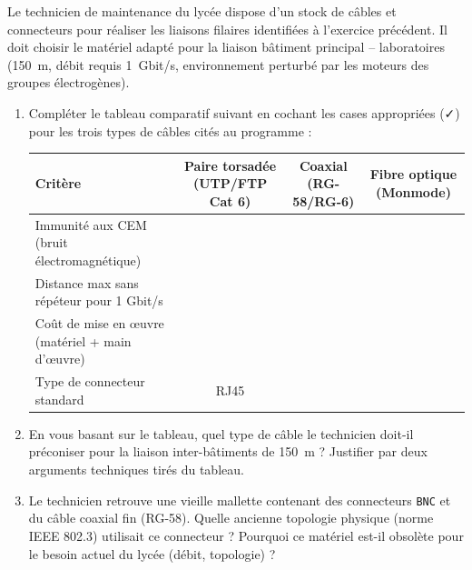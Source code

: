 \documentclass[11pt]{article}
\begin{document}
\begin{exercice}
Le technicien de maintenance du lycée dispose d'un stock de câbles et connecteurs pour réaliser les liaisons filaires identifiées à l'exercice précédent. Il doit choisir le matériel adapté pour la liaison bâtiment principal -- laboratoires (\SI{150}{m}, débit requis \SI{1}{Gbit/s}, environnement perturbé par les moteurs des groupes électrogènes).

\begin{enumerate}
    \item Compléter le tableau comparatif suivant en cochant les cases appropriées (✓) pour les trois types de câbles cités au programme :
    \begin{center}
    \begin{tabular}{|l|c|c|c|}
    \hline
    \textbf{Critère} & \textbf{Paire torsadée (UTP/FTP Cat 6)} & \textbf{Coaxial (RG-58/RG-6)} & \textbf{Fibre optique (Monmode)} \\
    \hline
    Immunité aux CEM (bruit électromagnétique) & & & \\
    \hline
    Distance max sans répéteur pour 1 Gbit/s & & & \\
    \hline
    Coût de mise en œuvre (matériel + main d'œuvre) & & & \\
    \hline
    Type de connecteur standard & RJ45 & & \\
    \hline
    \end{tabular}
    \end{center}
    \item En vous basant sur le tableau, quel type de câble le technicien doit-il préconiser pour la liaison inter-bâtiments de \SI{150}{m} ? Justifier par deux arguments techniques tirés du tableau.
    \item Le technicien retrouve une vieille mallette contenant des connecteurs \texttt{BNC} et du câble coaxial fin (RG-58). Quelle ancienne topologie physique (norme IEEE 802.3) utilisait ce connecteur ? Pourquoi ce matériel est-il obsolète pour le besoin actuel du lycée (débit, topologie) ?
\end{enumerate}
\end{exercice}
\end{document}
